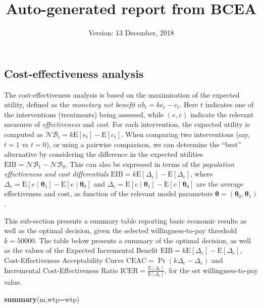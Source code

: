 \documentclass[]{article}
\title{Auto-generated report from BCEA}
\author{}
\date{Version: 13 December, 2018}
\newenvironment{Shaded}{\begin{snugshade}}{\end{snugshade}}
\newcommand{\DataTypeTok}[1]{\textcolor[rgb]{0.13,0.29,0.53}{#1}}
\newcommand{\KeywordTok}[1]{\textcolor[rgb]{0.13,0.29,0.53}{\textbf{#1}}}
\newcommand{\NormalTok}[1]{#1}
\begin{document}
\maketitle

\hypertarget{cost-effectiveness-analysis}{%
\subsection{Cost-effectiveness
analysis}\label{cost-effectiveness-analysis}}

The cost-effectiveness analysis is based on the maximisation of the
expected utility, defined as the \emph{monetary net benefit}
\(nb_t=ke_t-c_t\). Here \(t\) indicates one of the interventions
(treatments) being assessed, while \((e,c)\) indicate the relevant
measures of \emph{effectiveness} and \emph{cost}. For each intervention,
the expected utility is computed as
\(\mathcal{NB}_t=k\mbox{E}[e_t]-\mbox{E}[c_t]\). When comparing two
interventions (say, \(t=1\) vs \(t=0\)), or using a pairwise comparison,
we can determine the ``best'' alternative by considering the difference
in the expected utilities \(\mbox{EIB}=\mathcal{NB}_1-\mathcal{NB}_0\).
This can also be expressed in terms of the \emph{population
effectiveness and cost differentials}
\(\mbox{EIB}=k\mbox{E}[\Delta_e]-\mbox{E}[\Delta_c]\), where
\(\Delta_e=\mbox{E}[e\mid\bm\theta_1]-\mbox{E}[e\mid\bm\theta_0]\) and
\(\Delta_c=\mbox{E}[c\mid\bm\theta_1]-\mbox{E}[c\mid\bm\theta_0]\) are
the average effectiveness and cost, as function of the relevant model
parameters \(\bm\theta=(\bm\theta_0,\bm\theta_1)\).

This sub-section presents a summary table reporting basic economic
results as well as the optimal decision, given the selected
willingness-to-pay threshold \(k=50000\). The table below presents a
summary of the optimal decision, as well as the values of the Expected
Incremental Benefit
\(\mbox{EIB}=k\mbox{E}[\Delta_e]-\mbox{E}[\Delta_c]\),
Cost-Effectiveness Acceptability Curve
\(\mbox{CEAC}=\Pr(k\Delta_e-\Delta_c)\) and Incremental
Cost-Effectiveness Ratio
\(\mbox{ICER}=\displaystyle\frac{\mbox{E}[\Delta_c]}{\mbox{E}[\Delta_e]}\),
for the set willingness-to-pay value.

\begin{Shaded}
\begin{Highlighting}[]
\KeywordTok{summary}\NormalTok{(m,}\DataTypeTok{wtp=}\NormalTok{wtp)}
\end{Highlighting}
\end{Shaded}
\end{document}
